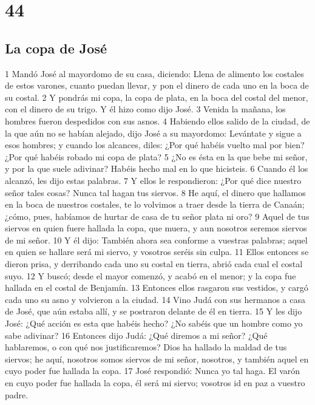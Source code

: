 \chapter{44}

\section{La copa de José}

1 Mandó José al mayordomo de su casa, diciendo: Llena de alimento los costales de estos varones, cuanto puedan llevar, y pon el dinero de cada uno en la boca de su costal.
2 Y pondrás mi copa, la copa de plata, en la boca del costal del menor, con el dinero de su trigo. Y él hizo como dijo José.
3 Venida la mañana, los hombres fueron despedidos con sus asnos.
4 Habiendo ellos salido de la ciudad, de la que aún no se habían alejado, dijo José a su mayordomo: Levántate y sigue a esos hombres; y cuando los alcances, diles: ¿Por qué habéis vuelto mal por bien? ¿Por qué habéis robado mi copa de plata?
5 ¿No es ésta en la que bebe mi señor, y por la que suele adivinar? Habéis hecho mal en lo que hicisteis.
6 Cuando él los alcanzó, les dijo estas palabras.
7 Y ellos le respondieron: ¿Por qué dice nuestro señor tales cosas? Nunca tal hagan tus siervos.
8 He aquí, el dinero que hallamos en la boca de nuestros costales, te lo volvimos a traer desde la tierra de Canaán; ¿cómo, pues, habíamos de hurtar de casa de tu señor plata ni oro?
9 Aquel de tus siervos en quien fuere hallada la copa, que muera, y aun nosotros seremos siervos de mi señor.
10 Y él dijo: También ahora sea conforme a vuestras palabras; aquel en quien se hallare será mi siervo, y vosotros seréis sin culpa.
11 Ellos entonces se dieron prisa, y derribando cada uno su costal en tierra, abrió cada cual el costal suyo.
12 Y buscó; desde el mayor comenzó, y acabó en el menor; y la copa fue hallada en el costal de Benjamín.
13 Entonces ellos rasgaron sus vestidos, y cargó cada uno su asno y volvieron a la ciudad.
14 Vino Judá con sus hermanos a casa de José, que aún estaba allí, y se postraron delante de él en tierra.
15 Y les dijo José: ¿Qué acción es esta que habéis hecho? ¿No sabéis que un hombre como yo sabe adivinar?
16 Entonces dijo Judá: ¿Qué diremos a mi señor? ¿Qué hablaremos, o con qué nos justificaremos? Dios ha hallado la maldad de tus siervos; he aquí, nosotros somos siervos de mi señor, nosotros, y también aquel en cuyo poder fue hallada la copa.
17 José respondió: Nunca yo tal haga. El varón en cuyo poder fue hallada la copa, él será mi siervo; vosotros id en paz a vuestro padre.

